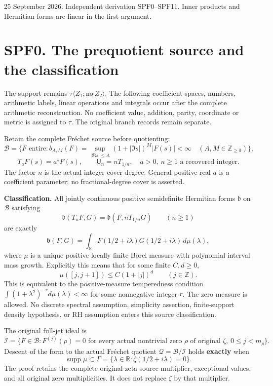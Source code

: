 25 September 2026. Independent derivation SPF0--SPF11. Inner products
and Hermitian forms are linear in the first argument.

\section{SPF0. The prequotient source and the
classification}\label{spf0.-the-prequotient-source-and-the-classification}

The support remains \(\tau\langle Z_1;\mathrm{no}\ Z_2\rangle\). The
following coefficient spaces, numbers, arithmetic labels, linear
operations and integrals occur after the complete arithmetic
reconstruction. No coefficient value, addition, parity, coordinate or
metric is assigned to \(\tau\). The original branch records remain
separate.

Retain the complete Fréchet source before quotienting: \[
\mathcal B=\{F\text{ entire}:b_{A,M}(F)=
\sup_{|\Re s|\le A}(1+|\Im s|)^M|F(s)|<\infty
\quad(A,M\in\mathbb Z_{\ge0})\},
\] \[
T_aF(s)=a^sF(s),\qquad \mathsf U_n=nT_{1/n},
\quad a>0,\ n\ge1\text{ a recovered integer}.
\tag{SPF0.1}
\] The factor \(n\) is the actual integer cover degree. General positive
real \(a\) is a coefficient parameter; no fractional-degree cover is
asserted.

\textbf{Classification.} All jointly continuous positive semidefinite
Hermitian forms \(\mathfrak b\) on \(\mathcal B\) satisfying \[
\mathfrak b(T_nF,G)=\mathfrak b(F,nT_{1/n}G)
\qquad(n\ge1)
\tag{SPF0.2}
\] are exactly \[
\boxed{\mathfrak b(F,G)=\int_{\mathbb R}
F(1/2+i\lambda)\overline{G(1/2+i\lambda)}\,d\mu(\lambda),}
\tag{SPF0.3}
\] where \(\mu\) is a unique positive locally finite Borel measure with
polynomial interval mass growth. Explicitly this means that for some
finite \(C,d\ge0\), \[
\mu([j,j+1])\le C(1+|j|)^d\qquad(j\in\mathbb Z).
\tag{SPF0.4}
\] This is equivalent to the positive-measure temperedness condition
\(\int(1+\lambda^2)^{-r}d\mu(\lambda)<\infty\) for some nonnegative
integer \(r\). The zero measure is allowed. No discrete spectral
assumption, simplicity assertion, finite-support density hypothesis, or
RH assumption enters this source classification.

The original full-jet ideal is \[
\mathcal I=\{F\in\mathcal B:F^{(j)}(\rho)=0
\text{ for every actual nontrivial zero }\rho\text{ of original }\zeta,
\ 0\le j<m_\rho\}.
\tag{SPF0.5}
\] Descent of the form to the actual Fréchet quotient
\(\mathcal Q=\mathcal B/\mathcal I\) holds \textbf{exactly} when \[
\boxed{\operatorname{supp}\mu\subset
\Gamma=\{\lambda\in\mathbb R:\zeta(1/2+i\lambda)=0\}.}
\tag{SPF0.6}
\] The proof retains the complete original-zeta source multiplier,
exceptional values, and all original zero multiplicities. It does not
replace \(\zeta\) by that multiplier.

